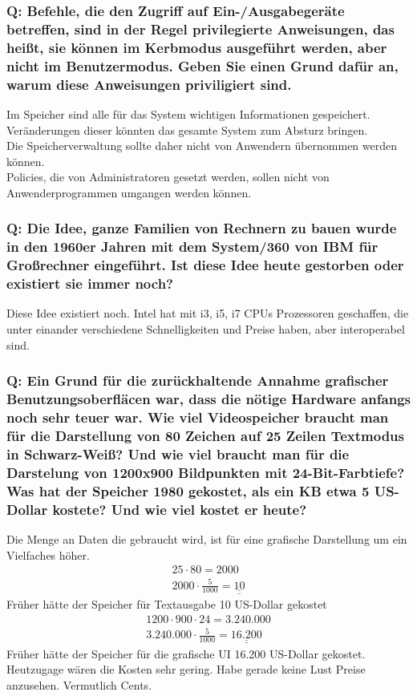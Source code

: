 \documentclass[12pt,a4paper]{univention}
\begin{document}
\subsubsection{Q: Befehle, die den Zugriff auf Ein-/Ausgabegeräte betreffen, sind in der Regel privilegierte Anweisungen, das heißt, sie können im Kerbmodus ausgeführt werden, aber nicht im Benutzermodus. Geben Sie einen Grund dafür an, warum diese Anweisungen priviligiert sind.}
Im Speicher sind alle für das System wichtigen Informationen gespeichert. Veränderungen dieser könnten das gesamte System zum Absturz bringen.\\Die Speicherverwaltung sollte daher nicht von Anwendern übernommen werden können.\\
Policies, die von Administratoren gesetzt werden, sollen nicht von Anwenderprogrammen umgangen werden können.
\subsubsection{Q: Die Idee, ganze Familien von Rechnern zu bauen wurde in den 1960er Jahren mit dem System/360 von IBM für Großrechner eingeführt. Ist diese Idee heute gestorben oder existiert sie immer noch?}
Diese Idee existiert noch. Intel hat mit i3, i5, i7 CPUs Prozessoren geschaffen, die unter einander verschiedene Schnelligkeiten und Preise haben, aber interoperabel sind.
\subsubsection{Q: Ein Grund für die zurückhaltende Annahme grafischer Benutzungsoberfläcen war, dass die nötige Hardware anfangs noch sehr teuer war. Wie viel Videospeicher braucht man für die Darstellung von 80 Zeichen auf 25 Zeilen Textmodus in Schwarz-Weiß? Und wie viel braucht man für die Darstelung von 1200x900 Bildpunkten mit 24-Bit-Farbtiefe? Was hat der Speicher 1980 gekostet, als ein KB etwa 5 US-Dollar kostete? Und wie viel kostet er heute?}
Die  Menge an Daten die gebraucht wird, ist für eine grafische Darstellung um ein Vielfaches höher.
\begin{align*}
25 \cdot 80 = 2000\\
2000 \cdot \frac{5}{1000} = \underline{\underline{10}}
\end{align*}
Früher hätte der Speicher für Textausgabe 10 US-Dollar gekostet
\begin{align*}
1200 \cdot 900 \cdot 24 = 3.240.000\\
3.240.000 \cdot \frac{5}{1000} =\underline{\underline{16.200}}
\end{align*}
Früher hätte der Speicher für die grafische UI 16.200 US-Dollar gekostet.
Heutzugage wären die Kosten sehr gering. Habe gerade keine Lust Preise anzusehen. Vermutlich Cents.
\end{document}
